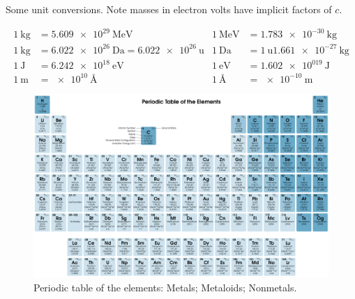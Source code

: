 \begin{table}[htb]
    \caption{Some unit conversions. Note masses in electron volts have implicit factors of \(c\).}
    \begin{align*}
        \qty{1}{\kilogram} &= \qty{5.609e29}{\mega\electronvolt} & \qty{1}{\mega\electronvolt} &= \qty{1.783e-30}{\kilogram}\\
        \qty{1}{\kilogram} &= \qty{6.022e26}{\dalton} = \qty{6.022e26}{\atomicmassunit} & \qty{1}{\dalton} &= \qty{1}{\atomicmassunit} \qty{1.661e-27}{\kilogram}\\
        \qty{1}{\joule} &= \qty{6.242e18}{\electronvolt} & \qty{1}{\electronvolt} &= \qty{1.602e019}{\joule}\\
        \qty{1}{\metre} &= \qty{e10}{\angstrom} & \qty{1}{\angstrom} &= \qty{e-10}{\metre}
    \end{align*}
\end{table}

\begin{figure}
    \centering
    \includegraphics[height=\textwidth, angle=90]{images/periodic-table/periodic-table.pdf}
    \tikzexternaldisable
    \caption{Periodic table of the elements: \protect{} Metals; \protect{} Metaloids; \protect{} Nonmetals.}
    \tikzexternalenable
\end{figure}